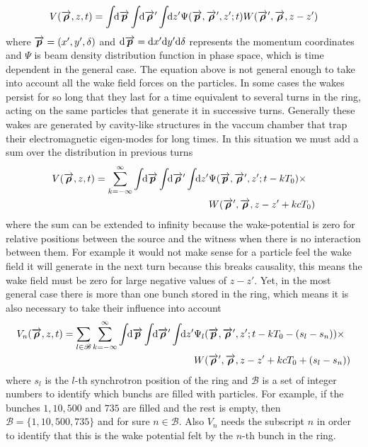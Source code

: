 \documentclass[
	12pt,				%
	openright,			%
	oneside,			%
	a4paper,		%
	chapter=TITLE,		%
	section=TITLE,		%
    brazil,				%
	english,			%
	sumario=tradicional,
	]{abntex2}
\begin{document}
  \begin{align}
  	  V(\overrightarrow{\boldsymbol{\rho}}, z, t) = \int\!\!\text{d}\overrightarrow{\boldsymbol{p}} \int\!\!\text{d}\overrightarrow{\boldsymbol{\rho}}' \int\!\!\text{d}z' 
	  			\Psi(\overrightarrow{\boldsymbol{p}},\overrightarrow{\boldsymbol{\rho}}',z'; t) W(\overrightarrow{\boldsymbol{\rho}}',\overrightarrow{\boldsymbol{\rho}},z-z')
  \end{align}
  where $\overrightarrow{\boldsymbol{p}} = (x', y', \delta)$ and $\text{d}\overrightarrow{\boldsymbol{p}} = \text{d}x'\text{d}y'\text{d}\delta$ represents the momentum coordinates and $\Psi$ is beam density distribution function in phase space, which is time dependent in the general case.  The equation above is not general enough to take into account all the wake field forces on the particles. In some cases the wakes persist for so long that they last for a time equivalent to several turns in the ring, acting on the same particles that generate it in successive turns. Generally these wakes are generated by cavity-like structures in the vaccum chamber that trap their electromagnetic eigen-modes for long times. In this situation we must add a sum over the distribution in previous turns
  \begin{align}\nonumber
  	  V(\overrightarrow{\boldsymbol{\rho}}, z, t) = \sum_{k=-\infty}^\infty\int\!\!\text{d}\overrightarrow{\boldsymbol{p}} \int\!\!\text{d}\overrightarrow{\boldsymbol{\rho}}' \int\!\!\text{d}z' 
	  			&\Psi(\overrightarrow{\boldsymbol{p}},\overrightarrow{\boldsymbol{\rho}}',z'; t-kT_0)\times\\ &W(\overrightarrow{\boldsymbol{\rho}}',\overrightarrow{\boldsymbol{\rho}},z-z' + kcT_0)
  \end{align}
  where the sum can be extended to infinity because the wake-potential is zero for relative positions between the source and the witness when there is no interaction between them. For example it would not make sense for a particle feel the wake field it will generate in the next turn because this breaks causality, this means the wake field must be zero for large negative values of $z-z'$. Yet, in the most general case there is more than one bunch stored in the ring, which means it is also necessary to take their influence into account
  \begin{align}\label{eq:general_eff_wake_pot}\nonumber
  	  V_n(\overrightarrow{\boldsymbol{\rho}}, z, t) = \sum_{l\in\mathscr{B}}\sum_{k=-\infty}^\infty\int\!\!\text{d}\overrightarrow{\boldsymbol{p}} \int\!\!\text{d}\overrightarrow{\boldsymbol{\rho}}' \int\!\!\text{d}z' 
	  			&\Psi_l(\overrightarrow{\boldsymbol{p}},\overrightarrow{\boldsymbol{\rho}}',z'; t-kT_0-(s_l-s_n))
				\times\\
				&W(\overrightarrow{\boldsymbol{\rho}}',\overrightarrow{\boldsymbol{\rho}},z-z' + kcT_0 + (s_l-s_n))
  \end{align}
  where $s_l$ is the $l$-th synchrotron position of the ring and $\mathscr{B}$ is a set of integer numbers to identify which bunchs are filled with particles. For example, if the bunches $1, 10, 500$ and $735$ are filled and the rest is empty, then $\mathscr{B} = \{ 1, 10, 500, 735 \}$ and for sure $n\in\mathscr{B}$. Also $V_n$ needs the subscript $n$ in order to identify that this is the wake potential felt by the $n$-th bunch in the ring.
\end{document}
